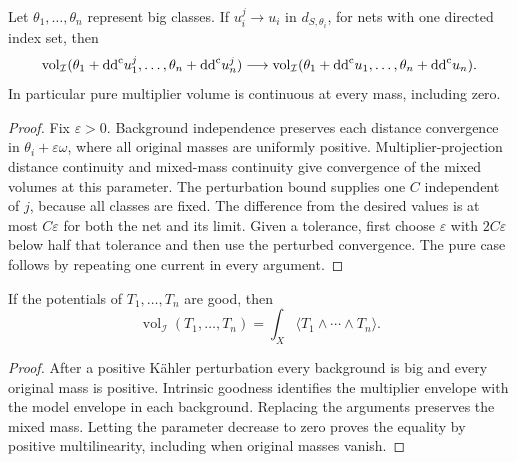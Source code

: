 \begin{theorem}\label{thm:mixed-multiplier-volume-distance-continuity}
Let $\theta_1,\ldots,\theta_n$ represent big classes. If $u_i^j\to u_i$ in $d_{S,\theta_i}$, for nets with one directed index set, then
\[
 \operatorname{vol}_{\mathcal I}(\theta_1+\mathrm{dd}^{\mathrm{c}} u_1^j,\ldots,\theta_n+\mathrm{dd}^{\mathrm{c}} u_n^j)
       \longrightarrow\operatorname{vol}_{\mathcal I}(\theta_1+\mathrm{dd}^{\mathrm{c}} u_1,\ldots,\theta_n+\mathrm{dd}^{\mathrm{c}} u_n).
\]
In particular pure multiplier volume is continuous at every mass, including zero.
\end{theorem}
\begin{proof}
Fix $\varepsilon>0$. Background independence preserves each distance convergence in $\theta_i+\varepsilon\omega$, where all original masses are uniformly positive. Multiplier-projection distance continuity and mixed-mass continuity give convergence of the mixed volumes at this parameter. The perturbation bound supplies one $C$ independent of $j$, because all classes are fixed. The difference from the desired values is at most $C\varepsilon$ for both the net and its limit. Given a tolerance, first choose $\varepsilon$ with $2C\varepsilon$ below half that tolerance and then use the perturbed convergence. The pure case follows by repeating one current in every argument.
\end{proof}

\begin{corollary}\label{cor:i-good-mixed-volume-equality}
If the potentials of $T_1,\ldots,T_n$ are good, then
\[
 \operatorname{vol}_{\mathcal I}(T_1,\ldots,T_n)
                          =\int_X\langle T_1\wedge\cdots\wedge T_n\rangle.
\]
\end{corollary}
\begin{proof}
After a positive K\"ahler perturbation every background is big and every original mass is positive. Intrinsic goodness identifies the multiplier envelope with the model envelope in each background. Replacing the arguments preserves the mixed mass. Letting the parameter decrease to zero proves the equality by positive multilinearity, including when original masses vanish.
\end{proof}


